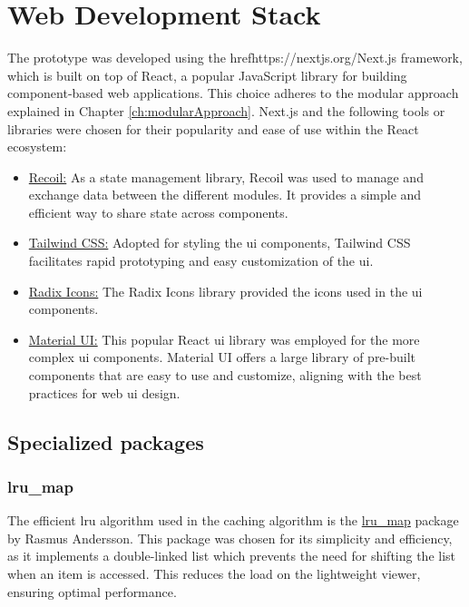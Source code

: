\section{Web Development Stack}
The prototype was developed using the href{https://nextjs.org/}{Next.js framework}, which is built on top of React, a popular JavaScript library for building component-based web applications. This choice adheres to the modular approach explained in Chapter \ref{ch:modularApproach}. Next.js and the following tools or libraries were chosen for their popularity and ease of use within the React ecosystem:

\begin{itemize}
    \item \href{https://recoiljs.org/}{Recoil:} As a state management library, Recoil was used to manage and exchange data between the different modules. It provides a simple and efficient way to share state across components.

    \item \href{https://tailwindcss.com/}{Tailwind CSS:} Adopted for styling the \ac{ui} components, Tailwind CSS facilitates rapid prototyping and easy customization of the \ac{ui}.

    \item \href{https://icons.radix-ui.com/}{Radix Icons:} The Radix Icons library provided the icons used in the \ac{ui} components.

    \item \href{https://mui.com/}{Material UI:} This popular React \ac{ui} library was employed for the more complex \ac{ui} components. Material UI offers a large library of pre-built components that are easy to use and customize, aligning with the best practices for web \ac{ui} design.
\end{itemize}

\subsection{Specialized packages}
\subsubsection{lru\_map}
The efficient \ac{lru} algorithm used in the caching algorithm is the \href{https://github.com/rsms/js-lru}{lru\_map} package by Rasmus Andersson. This package was chosen for its simplicity and efficiency, as it implements a double-linked list which prevents the need for shifting the list when an item is accessed. This reduces the load on the lightweight viewer, ensuring optimal performance.


